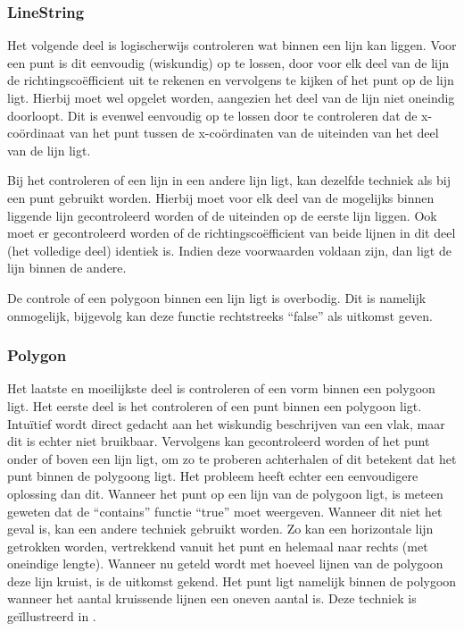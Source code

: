 \subsubsection{LineString}
Het volgende deel is logischerwijs controleren wat binnen een lijn kan liggen. Voor een punt is dit eenvoudig (wiskundig) op te lossen, door voor elk deel van de lijn de richtingscoëfficient uit te rekenen en vervolgens te kijken of het punt op de lijn ligt. Hierbij moet wel opgelet worden, aangezien het deel van de lijn niet oneindig doorloopt. Dit is evenwel eenvoudig op te lossen door te controleren dat de x-coördinaat van het punt tussen de x-coördinaten van de uiteinden van het deel van de lijn ligt.

Bij het controleren of een lijn in een andere lijn ligt, kan dezelfde techniek als bij een punt gebruikt worden. Hierbij moet voor elk deel van de mogelijks binnen liggende lijn gecontroleerd worden of de uiteinden op de eerste lijn liggen. Ook moet er gecontroleerd worden of de richtingscoëfficient van beide lijnen in dit deel (het volledige deel) identiek is. Indien deze voorwaarden voldaan zijn, dan ligt de lijn binnen de andere. 

De controle of een polygoon binnen een lijn ligt is overbodig. Dit is namelijk onmogelijk, bijgevolg kan deze functie rechtstreeks ``false'' als uitkomst geven.

\subsubsection{Polygon}
Het laatste en moeilijkste deel is controleren of een vorm binnen een polygoon ligt. Het eerste deel is het controleren of een punt binnen een polygoon ligt. Intuïtief wordt direct gedacht aan het wiskundig beschrijven van een vlak, maar dit is echter niet bruikbaar. Vervolgens kan gecontroleerd worden of het punt onder of boven een lijn ligt, om zo te proberen achterhalen of dit betekent dat het punt binnen de polygoong ligt. Het probleem heeft echter een eenvoudigere oplossing dan dit. Wanneer het punt op een lijn van de polygoon ligt, is meteen geweten dat de ``contains'' functie ``true'' moet weergeven. Wanneer dit niet het geval is, kan een andere techniek gebruikt worden. Zo kan een horizontale lijn getrokken worden, vertrekkend vanuit het punt en helemaal naar rechts (met oneindige lengte). Wanneer nu geteld wordt met hoeveel lijnen van de polygoon deze lijn kruist, is de uitkomst gekend. Het punt ligt namelijk binnen de polygoon wanneer het aantal kruissende lijnen een oneven aantal is. Deze techniek is geïllustreerd in .

